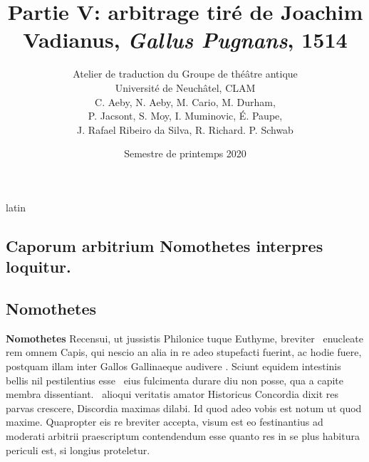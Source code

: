 \documentclass[12pt]{book}
\renewenvironment{latin}
    	{\begin{hyphenrules}{latin}}
    	{\end{hyphenrules}}
\begin{document}
        \title{Partie V: arbitrage tiré de Joachim Vadianus, \textit{Gallus Pugnans}, 1514}
        \author{Atelier de traduction du Groupe de théâtre antique\\
            Université de Neuchâtel, CLAM\\
            C. Aeby, N. Aeby, M. Cario, M. Durham,\\ 
            P. Jacsont, S. Moy, I. Muminovic, É. Paupe,\\
            J. Rafael Ribeiro da Silva, R. Richard. P. Schwab}
        \date{Semestre de printemps 2020}
        
        \maketitle
        \begin{pages}
        \begin{latin}
        \begin{Leftside}
        \beginnumbering 
            \pstart\section*{Caporum arbitrium Nomothetes interpres loquitur.}\pend\pstart\subsection*{Nomothetes}\pend\pstart\textbf{Nomothetes}\hspace{1cm} 
                        Recensui, ut jussistis Philonice tuque Euthyme, breviter ﻿\ampersand\ enucleate rem omnem Capis, 
                        qui nescio an alia in re  adeo stupefacti fuerint, 
                        ac hodie fuere, postquam illam inter Gallos Gallinaeque audivere . 
                        Sciunt equidem intestinis bellis nil pestilentius esse ﻿\ampersand\ eius  fulcimenta durare diu non posse, 
                        qua a capite membra dissentiant. 
                        ﻿\ampersand\ alioqui veritatis amator Historicus Concordia dixit res parvas crescere, Discordia maximas dilabi. 
                        Id quod adeo vobis est notum ut quod maxime. 
                        Quapropter eis re breviter accepta, 
                        visum est eo festinantius ad moderati arbitrii praescriptum contendendum esse quanto res in se plus habitura periculi est, 
                        si longius proteletur. 

\end{Leftside}
\end{latin}
\end{pages}
\end{document}
